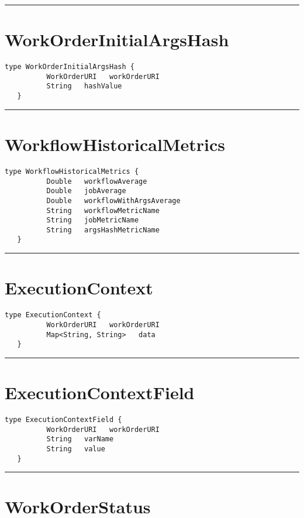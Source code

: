 \rule{12cm}{2pt}
\section{WorkOrderInitialArgsHash}
\label{type:WorkOrderInitialArgsHash}

\begin{lstlisting}[style=nonumbers]
   type WorkOrderInitialArgsHash {
          WorkOrderURI   workOrderURI
          String   hashValue
   }
\end{lstlisting}

\rule{12cm}{2pt}
\section{WorkflowHistoricalMetrics}
\label{type:WorkflowHistoricalMetrics}

\begin{lstlisting}[style=nonumbers]
   type WorkflowHistoricalMetrics {
          Double   workflowAverage
          Double   jobAverage
          Double   workflowWithArgsAverage
          String   workflowMetricName
          String   jobMetricName
          String   argsHashMetricName
   }
\end{lstlisting}

\rule{12cm}{2pt}
\section{ExecutionContext}
\label{type:ExecutionContext}

\begin{lstlisting}[style=nonumbers]
   type ExecutionContext {
          WorkOrderURI   workOrderURI
          Map<String, String>   data
   }
\end{lstlisting}

\rule{12cm}{2pt}
\section{ExecutionContextField}
\label{type:ExecutionContextField}

\begin{lstlisting}[style=nonumbers]
   type ExecutionContextField {
          WorkOrderURI   workOrderURI
          String   varName
          String   value
   }
\end{lstlisting}

\rule{12cm}{2pt}
\section{WorkOrderStatus}
\label{type:WorkOrderStatus}

